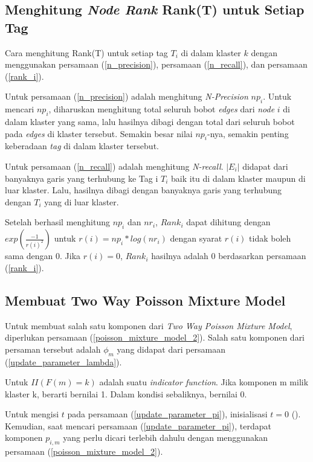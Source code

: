 \subsection{Menghitung \textit{Node Rank} Rank(T) untuk Setiap Tag}

Cara menghitung Rank(T) untuk setiap tag $T_i$ di dalam klaster $k$ dengan menggunakan persamaan (\ref{n_precision}), persamaan (\ref{n_recall}), dan persamaan (\ref{rank_i}).

Untuk persamaan (\ref{n_precision}) adalah menghitung \textit{N-Precision} $np_i$. Untuk mencari $np_i$, diharuskan menghitung total seluruh bobot \textit{edges} dari \textit{node} $i$ di dalam klaster yang sama, lalu hasilnya dibagi dengan total dari seluruh bobot pada \textit{edges} di klaster tersebut. Semakin besar nilai $np_i$-nya, semakin penting keberadaan \textit{tag} di dalam klaster tersebut.

Untuk persamaan (\ref{n_recall}) adalah menghitung \textit{N-recall}. $|E_i|$ didapat dari banyaknya garis yang terhubung ke Tag i $T_i$ baik itu di dalam klaster maupun di luar klaster. Lalu, hasilnya dibagi dengan banyaknya garis  yang terhubung dengan $T_i$ yang di luar klaster.

Setelah berhasil menghitung $np_i$ dan $nr_i$, $Rank_i$ dapat dihitung dengan $exp(\frac{-1}{r(i)^2})$ untuk $r(i) = np_i * log(nr_i)$ dengan syarat $r(i)$ tidak boleh sama dengan 0. Jika $r(i) = 0$, $Rank_i$ hasilnya adalah 0 berdasarkan persamaan (\ref{rank_i}).

\subsection{Membuat Two Way Poisson Mixture Model}

Untuk membuat salah satu komponen dari \textit{Two Way Poisson Mixture Model}, diperlukan persamaan (\ref{poisson_mixture_model_2}). Salah satu komponen dari persaman tersebut adalah $\phi_m$ yang didapat dari persamaan (\ref{update_parameter_lambda}). 

Untuk $II(F(m) = k)$ adalah suatu \textit{indicator function}. Jika komponen m milik klaster k, berarti bernilai 1. Dalam kondisi sebaliknya, bernilai 0.

Untuk mengisi $t$ pada persamaan (\ref{update_parameter_pi}), inisialisasi $t = 0$ (\cite{jia_2004_two_way_poisson_model}). Kemudian, saat mencari persamaan (\ref{update_parameter_pi}), terdapat komponen $p_{i,m}$ yang perlu dicari terlebih dahulu dengan menggunakan persamaan (\ref{poisson_mixture_model_2}). 


